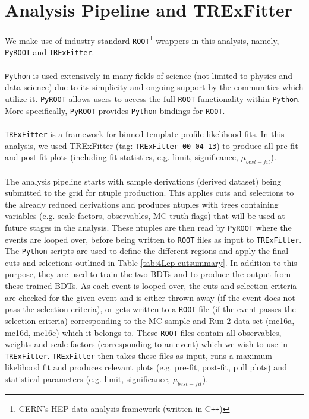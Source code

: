 \section{Analysis Pipeline and TRExFitter}
\label{sec:pipelineAnalysis-and-TRF}
We make use of industry standard \texttt{ROOT}\footnote{CERN's HEP data analysis framework (written in C\texttt{++})} wrappers in this analysis, namely, \texttt{PyROOT} and \texttt{TRExFitter}.\\\\
\texttt{Python} is used extensively in many fields of science (not limited to physics and data science) due to its simplicity and ongoing support by the communities which utilize it. \texttt{PyROOT} allows users to access the full \texttt{ROOT} functionality within \texttt{Python}. More specifically, \texttt{PyROOT} provides \texttt{Python} bindings for \texttt{ROOT}.\\\\
\texttt{TRExFitter} is a framework for binned template profile likelihood fits\cite{TRexfitter}. In this analysis, we used TRExFitter (tag: \texttt{TRExFitter-00-04-13}) to produce all pre-fit and post-fit plots (including fit statistics, e.g. limit, significance, $\mu_{best-fit}$).\\\\
The analysis pipeline starts with sample derivations (derived dataset) being submitted to the grid for ntuple production. This applies cuts and selections to the already reduced derivations and produces ntuples with trees containing variables (e.g. scale factors, observables, MC truth flags) that will be used at future stages in the analysis. These ntuples are then read by \texttt{PyROOT} where the events are looped over, before being written to \texttt{ROOT} files as input to \texttt{TRExFitter}. The \texttt{Python} scripts are used to define the different regions and apply the final cuts and selections outlined in Table \ref{tab:4Lep-cutsummary}. In addition to this purpose, they are used to train the two BDTs and to produce the output from these trained BDTs. As each event is looped over, the cuts and selection criteria are checked for the given event and is either thrown away (if the event does not pass the selection criteria), or gets written to a \texttt{ROOT} file (if the event passes the selection criteria) corresponding to the MC sample and Run 2 data-set (mc16a, mc16d, mc16e) which it belongs to. These \texttt{ROOT} files contain all observables, weights and scale factors (corresponding to an event) which we wish to use in \texttt{TRExFitter}. \texttt{TRExFitter} then takes these files as input, runs a maximum likelihood fit and produces relevant plots (e.g. pre-fit, post-fit, pull plots) and statistical parameters (e.g. limit, significance, $\mu_{best-fit}$).

